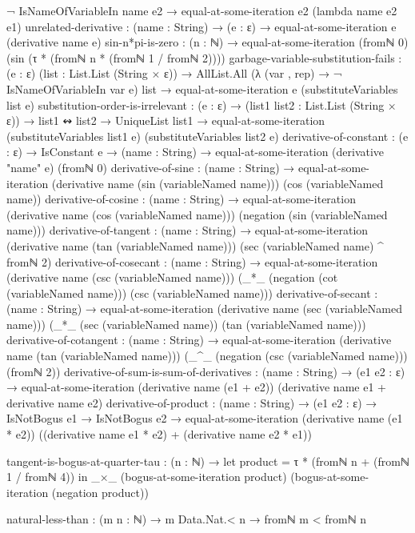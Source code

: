 \documentclass{report}
\begin{document}
\begin{code}
      ¬ IsNameOfVariableIn name e2 →
      equal-at-some-iteration e2 (lambda name e2 e1)
    unrelated-derivative :
      (name : String) →
      (e : ε) →
      equal-at-some-iteration e (derivative name e)
    sin-n*pi-is-zero :
      (n : ℕ) →
      equal-at-some-iteration (fromℕ 0)
                              (sin (τ * (fromℕ n * (fromℕ 1 / fromℕ 2))))
    garbage-variable-substitution-fails :
      (e : ε)
      (list : List.List (String × ε)) →
      AllList.All (λ (var , rep) → ¬ IsNameOfVariableIn var e)
                  list →
      equal-at-some-iteration e (substituteVariables list e)
    substitution-order-is-irrelevant :
      (e : ε) →
      (list1 list2 : List.List (String × ε)) →
      list1 ↭ list2 →
      UniqueList list1 →
      equal-at-some-iteration (substituteVariables list1 e)
                              (substituteVariables list2 e)
    derivative-of-constant :
      (e : ε) →
      IsConstant e →
      (name : String) →
      equal-at-some-iteration (derivative "name" e) (fromℕ 0)
    derivative-of-sine :
      (name : String) →
      equal-at-some-iteration (derivative name (sin (variableNamed name)))
                              (cos (variableNamed name))
    derivative-of-cosine :
      (name : String) →
      equal-at-some-iteration (derivative name (cos (variableNamed name)))
                              (negation (sin (variableNamed name)))
    derivative-of-tangent :
      (name : String) →
      equal-at-some-iteration (derivative name (tan (variableNamed name)))
                              (sec (variableNamed name) ^ fromℕ 2)
    derivative-of-cosecant :
      (name : String) →
      equal-at-some-iteration (derivative name (csc (variableNamed name)))
                              (_*_ (negation (cot (variableNamed name)))
                                   (csc (variableNamed name)))
    derivative-of-secant :
      (name : String) →
      equal-at-some-iteration (derivative name (sec (variableNamed name)))
                              (_*_ (sec (variableNamed name))
                                   (tan (variableNamed name)))
    derivative-of-cotangent :
      (name : String) →
      equal-at-some-iteration (derivative name (tan (variableNamed name)))
                              (_^_ (negation (csc (variableNamed name)))
                                   (fromℕ 2))
    derivative-of-sum-is-sum-of-derivatives :
      (name : String) →
      (e1 e2 : ε) →
      equal-at-some-iteration (derivative name (e1 + e2))
                              (derivative name e1 + derivative name e2)
    derivative-of-product :
      (name : String) →
      (e1 e2 : ε) →
      IsNotBogus e1 →
      IsNotBogus e2 →
      equal-at-some-iteration (derivative name (e1 * e2))
                              ((derivative name e1 * e2) + (derivative name e2 * e1))

    tangent-is-bogus-at-quarter-tau :
      (n : ℕ) →
      let product = τ * (fromℕ n + (fromℕ 1 / fromℕ 4)) in
      _×_ (bogus-at-some-iteration product)
          (bogus-at-some-iteration (negation product))

    natural-less-than : (m n : ℕ) → m Data.Nat.< n → fromℕ m < fromℕ n
\end{code}
\end{document}
